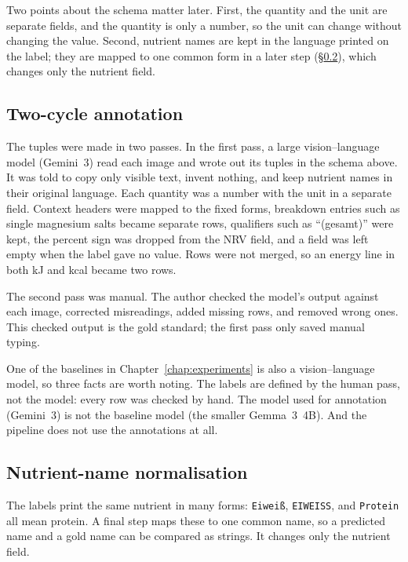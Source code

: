 Two points about the schema matter later. First, the quantity and the unit
are separate fields, and the quantity is only a number, so the unit can
change without changing the value. Second, nutrient names are kept in the
language printed on the label; they are mapped to one common form in a later
step (\S\ref{sec:schema-normalisation}), which changes only the nutrient
field.

\subsection{Two-cycle annotation}\label{sec:schema-annotation}

The tuples were made in two passes. In the first pass, a large
vision--language model (Gemini~3) read each image and wrote out its tuples
in the schema above. It was told to copy only visible text, invent nothing,
and keep nutrient names in their original language. Each quantity was a
number with the unit in a separate field. Context headers were mapped to
the fixed forms, breakdown entries such as single magnesium salts became
separate rows, qualifiers such as ``(gesamt)'' were kept, the percent sign
was dropped from the NRV field, and a field was left empty when the label
gave no value. Rows were not merged, so an energy line in both kJ and kcal
became two rows.

The second pass was manual. The author checked the model's output against
each image, corrected misreadings, added missing rows, and removed wrong
ones. This checked output is the gold standard; the first pass only saved
manual typing.

One of the baselines in Chapter~\ref{chap:experiments} is also a
vision--language model, so three facts are worth noting. The labels are
defined by the human pass, not the model: every row was checked by hand.
The model used for annotation (Gemini~3) is not the baseline model (the
smaller Gemma~3~4B). And the pipeline does not use the annotations at all.

\subsection{Nutrient-name normalisation}\label{sec:schema-normalisation}

The labels print the same nutrient in many forms: \texttt{Eiwei{\ss}},
\texttt{EIWEISS}, and \texttt{Protein} all mean protein. A final step maps
these to one common name, so a predicted name and a gold name can be
compared as strings. It changes only the nutrient field.

